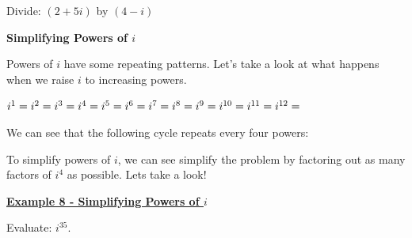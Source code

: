 \documentclass[12pt]{book}
\begin{document}
Divide: $(2+5i)$ by $(4-i)$

\vspace{50mm}

{\large \textbf{Simplifying Powers of $i$}}

Powers of $i$ have some repeating patterns. Let's take a look at what happens when we raise $i$ to increasing powers. 
\begin{multicols}{3}
  $i^1 = \\
    i^2 = \\
    i^3 = \\
    i^4 = \\
    i^5 = \\
    i^6 = \\
    i^7 = \\
    i^8 = \\
    i^9 = \\
    i^{10} = \\
    i^{11} = \\ 
    i^{12} = 
$
\end{multicols}

\vspace{3mm}
We can see that the following cycle repeats every four powers: 

\vspace{3mm}

To simplify powers of $i$, we can see simplify the problem by factoring out as many factors of $i^4$ as possible. Lets take a look!
\newpage

\underline{\textbf{Example 8 - Simplifying Powers of $i$}}

Evaluate: $i^{35}$.
\end{document}
